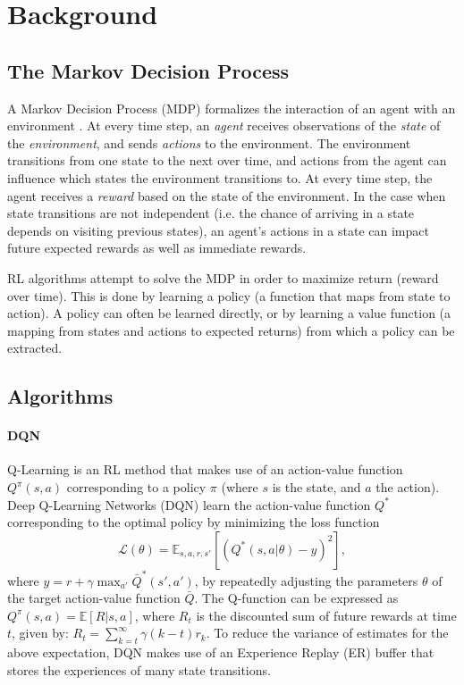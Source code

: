 \documentclass[11pt,a4paper]{article}
\begin{document}
\section{Background}
\label{sec:background}

\subsection{The Markov Decision Process}

A Markov Decision Process (MDP) formalizes the interaction of an agent with an environment \citep{SuttonBarto}.
At every time step, an \emph{agent} receives observations of the \emph{state} of the \emph{environment}, and sends \emph{actions} to the environment.
The environment transitions from one state to the next over time, and actions from the agent can influence which states the environment transitions to.
At every time step, the agent receives a \emph{reward} based on the state of the environment.
In the case when state transitions are not independent (i.e. the chance of arriving in a state depends on visiting previous states), an agent's actions in a state can impact future expected rewards as well as immediate rewards.

RL algorithms attempt to solve the MDP in order to maximize return (reward over time).
This is done by learning a policy (a function that maps from state to action).
A policy can often be learned directly, or by learning a value function (a mapping from states and actions to expected returns) from which a policy can be extracted.

\subsection{Algorithms}

\paragraph{DQN} Q-Learning \citep{watkins} is an RL method that makes use of an action-value function $Q^\pi(s, a)$ corresponding to a policy $\pi$ (where $s$ is the state, and $a$ the action).
Deep Q-Learning Networks (DQN) \citep{2015Natur.518..529M} learn the action-value function $Q^*$ corresponding to the optimal policy by minimizing the loss function
\begin{equation}
  \mathcal{L}(\theta)=\mathbb{E}_{s,a,r,s'}[(Q^*(s,a|\theta)-y)^2],
\end{equation}
where $y=r+\gamma\max_{a'}\bar{Q}^*(s',a')$,
by repeatedly adjusting the parameters $\theta$ of the target action-value function $\bar{Q}$.
The Q-function can be expressed as $Q^{\pi}(s,a)=\mathbb{E}[R|s,a]$, where $R_t$ is the discounted sum of future rewards at time $t$, given by: $R_t=\sum_{k=t}^\infty\gamma(k-t)r_k$.
To reduce the variance of estimates for the above expectation, DQN makes use of an Experience Replay (ER) buffer that stores the experiences of many state transitions.
\end{document}
